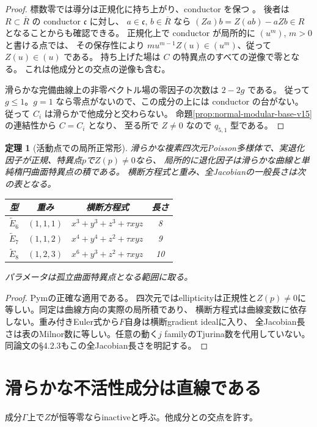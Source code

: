 \documentclass[11pt,a4paper]{ltjsarticle}
\newtheorem{theorem}{定理}[section]
\theoremstyle{remark}\newtheorem{remark}[theorem]{注意}
\begin{document}
\begin{proof}
標数零では導分は正規化に持ち上がり、conductor を保つ
\cite[主定理および169頁の系]{Seidenberg}。
後者は $R\subset\overline R$ の conductor $\mathfrak c$ に対し、
$a\in\mathfrak c$, $b\in\overline R$ なら
$(Za)b=Z(ab)-aZb\in R$ となることからも確認できる。
正規化上で conductor が局所的に $(u^m)$, $m>0$ と書ける点では、
その保存性により
$m u^{m-1}Z(u)\in(u^m)$、従って $Z(u)\in(u)$ である。
持ち上げた場は $C$ の特異点のすべての逆像で零となる。
これは他成分との交点の逆像も含む。

滑らかな完備曲線上の非零ベクトル場の零因子の次数は $2-2g$ である。
従って $g\le1$。$g=1$ なら零点がないので、この成分の上には conductor の台がない。
従って $C_i$ は滑らかで他成分と交わらない。
命題\ref{prop:normal-modular-base-v15}の連結性から $C=C_i$ となり、
至る所で $Z\ne0$ なので $q_{5,1}$ 型である。
\end{proof}



\begin{theorem}[活動点での局所正常形]\label{thm:pym-local}
滑らかな複素四次元Poisson多様体で、実退化因子が正規、特異点$p$で$Z(p)\ne0$なら、
局所的に退化因子は滑らかな曲線と単純楕円曲面特異点の積である。
横断方程式と重み、全Jacobianの一般長さは次の表となる。
\begin{center}\begin{tabular}{cccc}\toprule
型&重み&横断方程式&長さ\\\midrule
$\widetilde E_6$&$(1,1,1)$&$x^3+y^3+z^3+\tau xyz$&8\\
$\widetilde E_7$&$(1,1,2)$&$x^4+y^4+z^2+\tau xyz$&9\\
$\widetilde E_8$&$(1,2,3)$&$x^6+y^3+z^2+\tau xyz$&10\\\bottomrule
\end{tabular}\end{center}
パラメータは孤立曲面特異点となる範囲に取る。
\end{theorem}
\begin{proof}
Pym\cite[Theorem 4.5, Table 1]{PymElliptic}の正確な適用である。
四次元ではellipticityは正規性と$Z(p)\ne0$に等しい。同定は曲線方向の実際の局所積であり、
横断方程式は曲線変数に依存しない。重み付きEuler式から$F$自身は横断gradient idealに入り、
全Jacobian長さは表のMilnor数に等しい。任意の動く$j$ familyのTjurina数を代用していない。
同論文の\S4.2.3もこの全Jacobian長さを明記する。
\end{proof}
\section{滑らかな不活性成分は直線である}\label{sec:smooth-inactive}
成分$\Gamma$上で$Z$が恒等零ならinactiveと呼ぶ。他成分との交点を許す。
\end{document}
